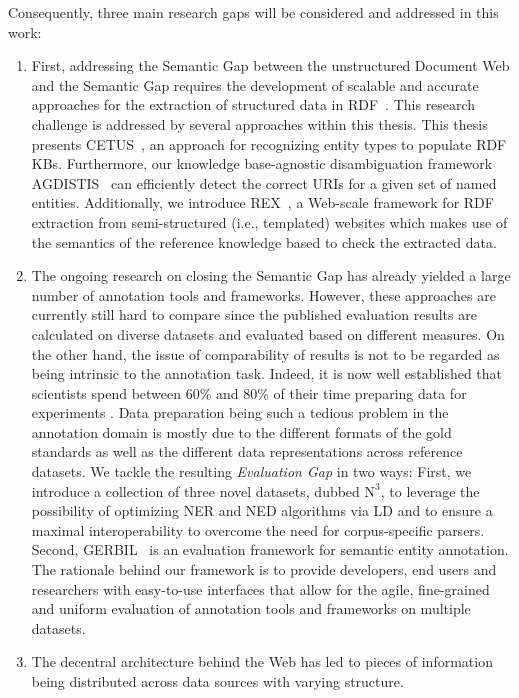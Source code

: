 Consequently, three main research gaps will be considered and addressed in this work:
\begin{enumerate}
\item 
First, addressing the Semantic Gap between the unstructured Document Web and the Semantic Gap requires the development of scalable and accurate approaches for the extraction of structured data in \ac{RDF}~\cite{rdfprimer}.
This research challenge is addressed by several approaches within this thesis.
This thesis presents CETUS~\cite{CETUS_2015}, an approach for recognizing entity types to populate \ac{RDF} \ac{KB}s. 
Furthermore, our knowledge base-agnostic disambiguation framework AGDISTIS~\cite{agdistis_iswc} can efficiently detect the correct URIs for a given set of named entities.
Additionally, we introduce REX~\cite{rex}, a Web-scale framework for \ac{RDF} extraction from semi-structured (i.e., templated) websites which makes use of the semantics of the reference knowledge based to check the extracted data.
\item 
The ongoing research on closing the Semantic Gap has already yielded a large number of annotation tools and frameworks.
However, these approaches are currently still hard to compare since the published evaluation results are calculated on diverse datasets and evaluated based on different measures.
On the other hand, the issue of  comparability of results is not to be regarded as being intrinsic to the annotation task. 
Indeed, it is now well established that scientists spend between 60\% and 80\% of their time preparing data for experiments \cite{GIL2014,jermyn1999preparing,peng2011reproducible}. 
Data preparation being such a tedious problem in the annotation domain is mostly due to the different formats of the gold standards as well as the different data representations across reference datasets.
We tackle the resulting \emph{Evaluation Gap} in two ways: First, we introduce a collection of three novel datasets, dubbed $\mbox{N}^3$, to leverage the possibility of optimizing NER and NED algorithms via \ac{LD} and to ensure a maximal interoperability to overcome the need for corpus-specific parsers. 
Second, GERBIL~\cite{GERBIL} is an evaluation framework for semantic entity annotation. 
The rationale behind our framework is to provide developers, end users and researchers with easy-to-use interfaces that allow for the agile, fine-grained and uniform evaluation of annotation tools and frameworks on multiple datasets.
\item 
The decentral architecture behind the Web has led to pieces of information being distributed across data sources with varying structure. 

\end{enumerate}
